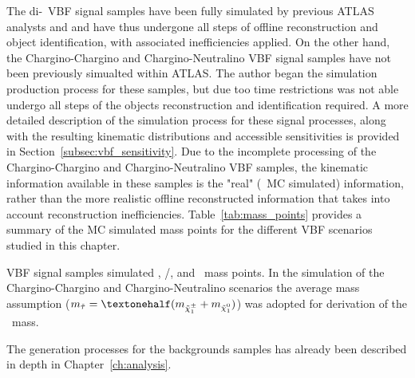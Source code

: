 	The di-\stau\ \ac{VBF} signal samples have been fully simulated by previous \ac{ATLAS} analysts and and have thus undergone all steps of offline reconstruction and object identification, with associated inefficiencies applied. 
	On the other hand, the Chargino-Chargino and Chargino-Neutralino \ac{VBF} signal samples have not been previously simualted within \ac{ATLAS}. The author began the simulation production process for these samples, but due too time restrictions was not able undergo all steps of the objects reconstruction and identification required. A more detailed description of the simulation process for these signal processes, along with the resulting kinematic distributions and accessible sensitivities is provided in Section~\ref{subsec:vbf_sensitivity}.
	Due to the incomplete processing of the Chargino-Chargino and Chargino-Neutralino \ac{VBF} samples,  the kinematic information available in these samples is the "real" (\ie\ \ac{MC} simulated) information, rather than the more realistic offline reconstructed information that takes into account reconstruction inefficiencies.
	Table~\ref{tab:mass_points} provides a summary of the \ac{MC} simulated mass points for the different \ac{VBF} scenarios studied in this chapter.
	\begin{table}[!hbt]
	\centering
	\caption{\ac{VBF} signal samples simulated \stau, \chinoonepm/\ninotwo, and \ninoone\ mass points. In the simulation of the Chargino-Chargino and Chargino-Neutralino scenarios the average mass assumption ($m_{\stau}=\textonehalf(m_{\chinoonepm}+m_{\ninoone})$) was adopted for derivation of the \stau\ mass.}
		
	\label{tab:mass_points}
	\end{table}
	
	The generation processes for the backgrounds samples has already been described in depth in Chapter~\ref{ch:analysis}.
	
